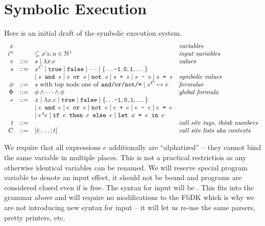 %
\newcommand{\sat}{\textsc{Sat}}
\newcommand{\sats}{\textsc{Sats}}
\newcommand{\plusplus}{\mathnormal{+}\mathnormal{+}}

\chapter{Symbolic Execution}\label{ch_symbolic}
Here is an initial draft of the symbolic execution system.
$$
\begin{array}{rcll}
  x && & \textit{variables}\\
  i^n && \subseteq x\text{'s}, n \in \mathbb N^+ & \textit{input variables}\\
  v &::=& s  \mid \lambda x. e  & \textit{values}\\
  s &::=&x^C \mid \texttt{true} \mid \texttt{false} \mid \dots \mid \{\dots \texttt{-1}, \texttt{0}, \texttt{1}, \dots\}\\
 &&   \mid s \texttt{ and } s \mid s \texttt{ or } s \mid \texttt{not }
          s \mid s \texttt{ + } s \mid s \texttt{ - } s \mid s \texttt{ = } s& \textit{symbolic values}\\
  \phi &::=& \text{$s$ with top node one of \texttt{and/or/not/=}} \mid x^C \mapsto v&\textit{formulae}\\
  \Phi &::=& \phi \land \dots \land \phi &\textit{global formula}\\
e &::=& x \mid \lambda x. e \mid \texttt{true} \mid \texttt{false} \mid \{\dots \texttt{-1}, \texttt{0}, \texttt{1}, \dots\}\\
  &   & \mid e \texttt{ and } e \mid e \texttt{ or } e \mid \texttt{not }
        e \mid e \texttt{ + }e \mid e \texttt{ - }e \mid e \texttt{ = }e \\
& & \mid e^{\,t}e
\mid \texttt{if }e\texttt{ then }e\texttt{ else }e
\mid \texttt{let } x \texttt{ = }e\texttt{ in }e\\
t &::=& & \textit{call site tags, think numbers}\\
C &::=& [t;\ldots;t] & \textit{call site lists aka contexts}\\
\end{array}
$$

We require that all expressions $e$ additionally are ``alphatized'' -- they cannot bind the same variable in multiple places.  This is not a practical restriction as any otherwise identical variables can be renamed.  We will reserve special program variable  to denote an input effect, it should not be bound and programs are considered closed even if  is free.  The syntax for input will be .  This fits into the grammar above and will require no modifications to the FbDK which is why we are not introducing new syntax for input -- it will let us re-use the same \Fb{} parsers, pretty printers, etc.

